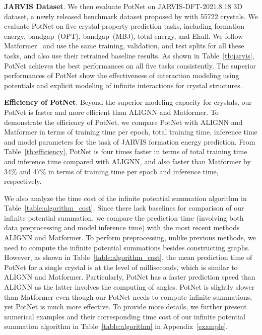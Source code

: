 \documentclass[nohyperref]{article}
\theoremstyle{plain}
\theoremstyle{definition}
\theoremstyle{remark}
\begin{document}
\textbf{JARVIS Dataset}. We then evaluate PotNet on JARVIS-DFT-2021.8.18 3D dataset, a newly released benchmark dataset proposed by \citet{choudhary2020joint} with 55722 crystals. We evaluate PotNet on five crystal property prediction tasks, including formation energy, bandgap~(OPT), bandgap~(MBJ), total energy, and Ehull. We follow Matformer~\citep{yan2022periodic} and use the same training, validation, and test splits for all these tasks, and also use their retrained baseline results. As shown in Table~\ref{tb:jarvis}, PotNet achieves the best performances on all five tasks consistently. The superior performances of PotNet show the effectiveness of interaction modeling using potentials and explicit modeling of infinite interactions for crystal structures. 




\textbf{Efficiency of PotNet}. Beyond the superior modeling capacity for crystals, our PotNet is faster and more efficient than ALIGNN and Matformer. To demonstrate the efficiency of PotNet, we compare PotNet with ALIGNN and Matformer in terms of training time per epoch, total training time, inference time and model parameters for the task of JARVIS formation energy prediction. From Table~\ref{tb:efficiency},  PotNet is four times faster in terms of total training time and inference time compared with ALIGNN, and also faster than Matformer by 34\% and 47\% in terms of training time per epoch and inference time, respectively.

We also analyze the time cost of the infinite potential summation algorithm in Table~\ref{table:algorithm_cost}. Since there lack baselines for comparison of our infinite potential summation, we compare the prediction time (involving both data preprocessing and model inference time) with the most recent methods ALIGNN and Matformer. To perform preprocessing, unlike previous methods, we need to compute the infinite potential summations besides constructing graphs. However, as shown in Table~\ref{table:algorithm_cost}, the mean prediction time of PotNet for a single crystal is at the level of milliseconds, which is similar to ALIGNN and Matformer. Particularly, PotNet has a faster prediction speed than ALIGNN as the latter involves the computing of angles. 
PotNet is slightly slower than Matformer even though our PotNet needs to compute infinite summations, yet PotNet is much more effective.
To provide more details, we further present numerical examples and their corresponding time cost of our infinite potential summation algorithm in Table~\ref{table:algorithm} in Appendix~\ref{example}.
\end{document}
